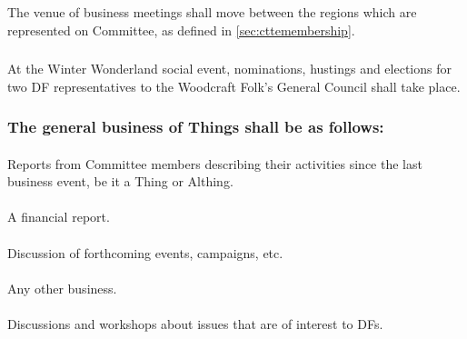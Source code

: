 \documentclass[a4paper, 12pt]{report}
\begin{document}
\subsubsection{}
The venue of business meetings shall move between the regions which are represented on Committee, as defined in \ref{sec:cttemembership}.
\subsubsection{}
At the Winter Wonderland social event, nominations, hustings and elections for two DF representatives to the Woodcraft Folk's General Council shall take place.
\subsubsection{The general business of Things shall be as follows:}
\paragraph{}
Reports from Committee members describing their activities since the last business event, be it a Thing or Althing.
\paragraph{}
A financial report.
\paragraph{}
Discussion of forthcoming events, campaigns, etc. 
\paragraph{}
Any other business.
\paragraph{}
Discussions and workshops about issues that are of interest to DFs. 
\end{document}
